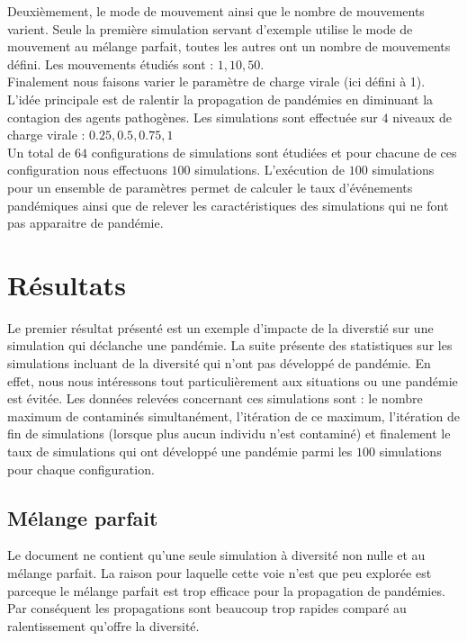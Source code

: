 Deuxièmement, le mode de mouvement ainsi que le nombre de mouvements varient. Seule la première simulation servant d'exemple utilise le mode de mouvement au mélange parfait, toutes les autres ont un nombre de mouvements défini. Les mouvements étudiés sont : $1,10,50$.\\

Finalement nous faisons varier le paramètre de charge virale (ici défini à 1). L'idée principale est de ralentir la propagation de pandémies en diminuant la contagion des agents pathogènes. Les simulations sont effectuée sur $4$ niveaux de charge virale : $0.25,0.5,0.75,1$\\

Un total de $64$ configurations de simulations sont étudiées et pour chacune de ces configuration nous effectuons $100$ simulations. L'exécution de $100$ simulations pour un ensemble de paramètres permet de calculer le taux d'événements pandémiques ainsi que de relever les caractéristiques des simulations qui ne font pas apparaitre de pandémie.

\section{Résultats}

Le premier résultat présenté est un exemple d'impacte de la diverstié sur une simulation qui déclanche une pandémie. La suite présente des statistiques sur les simulations incluant de la diversité qui n'ont pas développé de pandémie. En effet, nous nous intéressons tout particulièrement aux situations ou une pandémie est évitée. Les données relevées concernant ces simulations sont : le nombre maximum de contaminés simultanément, l'itération de ce maximum, l'itération de fin de simulations (lorsque plus aucun individu n'est contaminé) et finalement le taux de simulations qui ont développé une pandémie parmi les $100$ simulations pour chaque configuration.

\subsection{Mélange parfait}

Le document ne contient qu'une seule simulation à diversité non nulle et au mélange parfait. La raison pour laquelle cette voie n'est que peu explorée est parceque le mélange parfait est trop efficace pour la propagation de pandémies. Par conséquent les propagations sont beaucoup trop rapides comparé au ralentissement qu'offre la diversité.

